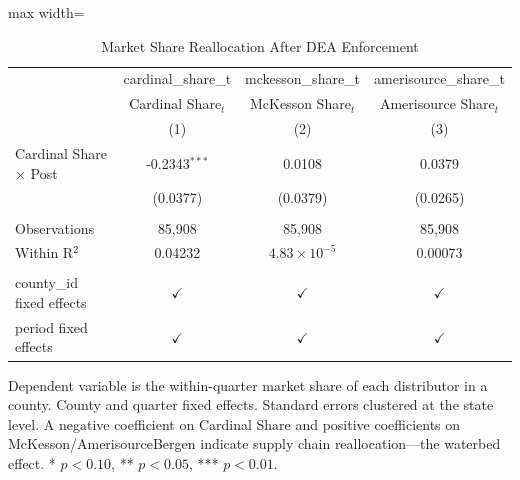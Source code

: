 
\begin{table}[htbp]
   \caption{\label{tab:reallocation} Market Share Reallocation After DEA Enforcement}
   \bigskip
   \centering
   \begin{adjustbox}{max width=\textwidth}
   \begin{tabular}{lccc}
      \toprule
                                    & cardinal\_share\_t   & mckesson\_share\_t    & amerisource\_share\_t\\    
                                    & Cardinal Share$_t$   & McKesson Share$_t$    & Amerisource Share$_t$ \\   
                                    & (1)                  & (2)                   & (3)\\  
      \midrule 
      Cardinal Share $\times$ Post  & -0.2343$^{***}$      & 0.0108                & 0.0379\\   
                                    & (0.0377)             & (0.0379)              & (0.0265)\\   
       \\
      Observations                  & 85,908               & 85,908                & 85,908\\  
      Within R$^2$                  & 0.04232              & $4.83\times 10^{-5}$  & 0.00073\\  
       \\
      county\_id fixed effects      & $\checkmark$         & $\checkmark$          & $\checkmark$\\   
      period fixed effects          & $\checkmark$         & $\checkmark$          & $\checkmark$\\   
      \bottomrule
   \end{tabular}
   \end{adjustbox}
   
   \par \raggedright 
   Dependent variable is the within-quarter market share of each distributor in a county. County and quarter fixed effects. Standard errors clustered at the state level. A negative coefficient on Cardinal Share and positive coefficients on McKesson/AmerisourceBergen indicate supply chain reallocation---the waterbed effect. * $p<0.10$, ** $p<0.05$, *** $p<0.01$.
\end{table}



